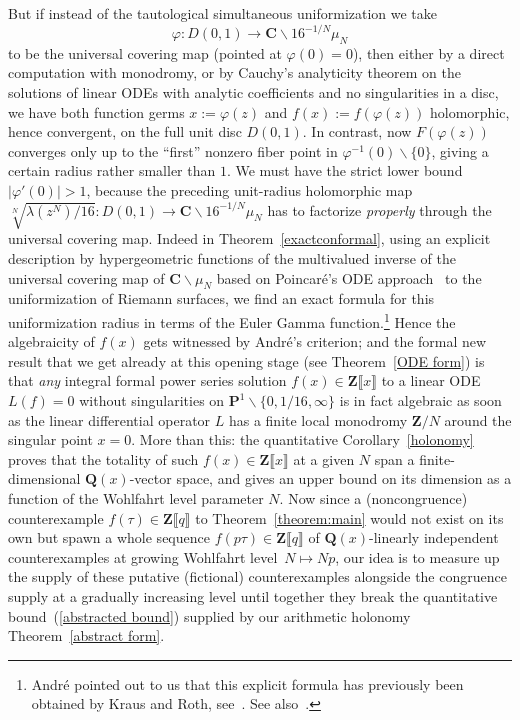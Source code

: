 \documentclass[10pt]{amsart}
\def\SSS{\S}
\renewcommand\setminus{\smallsetminus}
\def\Z{\mathbf{Z}}
\def\Q{\mathbf{Q}}
\renewcommand\mathbb{\mathbf}
\theoremstyle{remark}
\numberwithin{equation}{subsection}
\def\C{\mathbf{C}}
\begin{document}
But if instead of the tautological simultaneous uniformization we take 
$$\varphi : D(0,1) \to \C \setminus 16^{-1/N} \mu_N$$ to be the universal covering map (pointed at $\varphi(0) = 0$), then  either by a direct computation with monodromy, or by Cauchy's analyticity theorem on the solutions of linear ODEs with analytic coefficients and no singularities in a disc, we have both function germs $x := \varphi(z)$ and $f(x) := f(\varphi(z))$ holomorphic, hence convergent, on the full unit disc $D(0,1)$. In contrast, now $F(\varphi(z))$ converges only up to the ``first'' nonzero fiber point in $\varphi^{-1}(0) \setminus \{0\}$, giving a certain radius rather smaller than $1$. We must have the strict lower bound $|\varphi'(0)| > 1$, because the preceding unit-radius holomorphic map $\sqrt[N]{\lambda(z^N)/16} : D(0,1) \to \C \setminus 16^{-1/N}\mu_N$ has to factorize \emph{properly} through the universal covering map. Indeed in Theorem~\ref{exactconformal}, using an explicit description by hypergeometric functions of the multivalued inverse of the universal covering map of $\C \setminus \mu_N$ based on Poincar\'e's ODE approach~\cite{Hempel} to the uniformization of Riemann surfaces, we find an exact formula for this uniformization radius in terms of the Euler Gamma function.\footnote{Andr\'e pointed out to us that this explicit formula has  previously been obtained by Kraus and Roth, see~\cite[Remark~5.1]{KrausRoth}. See also~\cite[\SSS~III.1]{Goluzin}.} 
Hence the algebraicity of $f(x)$ gets witnessed by Andr\'e's criterion; and the formal new result that we get already at this opening stage (see Theorem~\ref{ODE form}) is that \emph{any} integral formal power series solution $f(x) \in \Z\llbracket x \rrbracket$ to a linear ODE $L(f) = 0$ without singularities on $\mathbb{P}^1 \setminus \{0,1/16,\infty\}$ is in fact algebraic as soon as the linear differential operator $L$ has a finite local monodromy $\Z/N$ around the singular point $x = 0$. More than this: the quantitative Corollary~\ref{holonomy}  proves that the totality of such $f(x) \in \Z\llbracket x \rrbracket$ at a given $N$ span a finite-dimensional $\Q(x)$-vector space, and gives an upper bound on its dimension as a function of the Wohlfahrt level parameter $N$. Now since a (noncongruence) counterexample $f(\tau) \in \Z\llbracket q \rrbracket$ to Theorem~\ref{theorem:main} would not 
exist on its own
 but spawn a whole sequence $f(p \tau) \in \Z\llbracket q \rrbracket$ of  $\Q(x)$-linearly independent counterexamples at growing Wohlfahrt level~$N \mapsto Np$, 
our idea is to measure up the supply of these putative (fictional) counterexamples alongside the congruence supply at a gradually increasing level until together they break the quantitative bound~(\ref{abstracted bound}) supplied by our arithmetic holonomy Theorem~\ref{abstract form}. 
\end{document}
